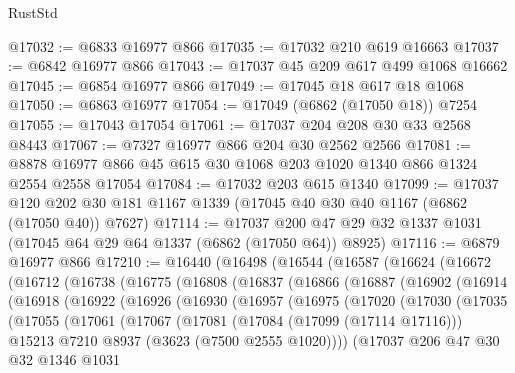 \begin{lexlean}{RustStd}
\begin{coremodule}
@17032 := @6833 @16977 @866
@17035 := @17032 @210 @619 @16663
@17037 := @6842 @16977 @866
@17043 := @17037 @45 @209 @617 @499 @1068 @16662
@17045 := @6854 @16977 @866
@17049 := @17045 @18 @617 @18 @1068
@17050 := @6863 @16977
@17054 := @17049 (@6862 (@17050 @18)) @7254
@17055 := @17043 @17054
@17061 := @17037 @204 @208 @30 @33 @2568 @8443
@17067 := @7327 @16977 @866 @204 @30 @2562 @2566
@17081 := @8878 @16977 @866 @45 @615 @30 @1068 @203 @1020 @1340 @866 @1324 @2554 @2558 @17054
@17084 := @17032 @203 @615 @1340
@17099 := @17037
    @120
    @202
    @30
    @181
    @1167
    @1339
    (@17045 @40 @30 @40 @1167 (@6862 (@17050 @40)) @7627)
@17114 := @17037 @200 @47 @29 @32 @1337 @1031 (@17045 @64 @29 @64 @1337 (@6862 (@17050 @64)) @8925)
@17116 := @6879 @16977 @866
@17210 := @16440
    (@16498
      (@16544
        (@16587
          (@16624
            (@16672
              (@16712
                (@16738
                  (@16775
                    (@16808
                      (@16837
                        (@16866
                          (@16887
                            (@16902
                              (@16914
                                (@16918
                                  (@16922
                                    (@16926
                                      (@16930
                                        (@16957
                                          (@16975
                                            (@17020
                                              (@17030
                                                (@17035
                                                  (@17055
                                                    (@17061
                                                      (@17067
                                                        (@17081
                                                          (@17084 (@17099 (@17114 @17116)))
                                                          @15213
                                                          @7210
                                                          @8937
                                                          (@3623 (@7500 @2555 @1020))))
                                                      (@17037
                                                        @206
                                                        @47
                                                        @30
                                                        @32
                                                        @1346
                                                        @1031

\end{coremodule}
\end{lexlean}
